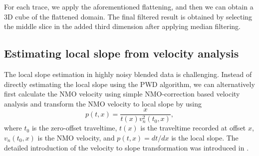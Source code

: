 For each trace, we apply the aforementioned flattening, and then we can obtain a 3D cube of the flattened domain. The final filtered result is obtained by selecting the middle slice in the added third dimension after applying median filtering.

\subsection{Estimating local slope from velocity analysis}
The local slope estimation in highly noisy blended data is challenging. Instead of directly estimating the local slope using the PWD algorithm, we can alternatively first calculate the NMO velocity using simple NMO-correction based velocity analysis and transform the NMO velocity to local slope \cite[]{liuyang2013} by using
\begin{equation}
\label{eq:vtop}
p(t,x)=\frac{x}{t(x)v_n^2(t_0,x)},
\end{equation}
where $t_0$ is the zero-offset traveltime, $t(x)$ is the traveltime recorded at offset $x$, $v_n(t_0,x)$ is the NMO velocity, and $p(t,x)=dt/dx$ is the local slope. The detailed introduction of the velocity to slope transformation was introduced in \cite{liuyang2013}. 

